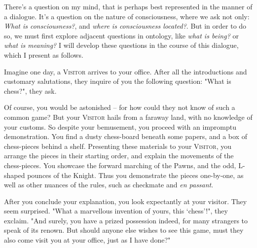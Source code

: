 
\noindent
There's a question on my mind, that is perhaps best represented in the manner of a dialogue. It's a question on the nature of consciousness, where we ask not only: \emph{What is consciousness?}, and \emph{where is consciousness located?}. But in order to do so, we must first explore adjacent questions in ontology, like \emph{what is being?} or \emph{what is meaning?} I will develop these questions in the course of this dialogue, which I present as follows.


Imagine one day, a \textsc{Visitor} arrives to your office. After all the introductions and customary salutations, they inquire of you the following question: "What is chess?", they ask.

Of course, you would be astonished -- for how could they not know of such a common game? But your \textsc{Visitor} hails from a faraway land, with no knowledge of your customs. So despite your bemusement, you proceed with an impromptu demonstration. You find a dusty chess-board beneath some papers, and a box of chess-pieces behind a shelf. Presenting these materials to your \textsc{Visitor}, you arrange the pieces in their starting order, and explain the movements of the chess-pieces. You showcase the forward marching of the Pawns, and the odd, L-shaped pounces of the Knight. Thus you demonstrate the pieces one-by-one, as well as other nuances of the rules, such as checkmate and \emph{en passant}.

After you conclude your explanation, you look expectantly at your visitor. They seem surprised. "What a marvellous invention of yours, this `chess'!", they exclaim. "And surely, you have a prized possession indeed, for many strangers to speak of its renown. But should anyone else wishes to see this game, must they also come visit you at your office, just as I have done?"

